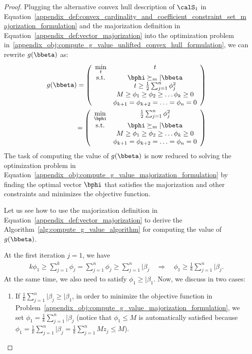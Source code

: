 \begin{proof}
Plugging the alternative convex hull description of $\calS_1$ in Equation~\eqref{appendix_def:convex_cardinality_and_coefficient_constraint_set_majorization_formulation} and the majorization definition in Equation~\eqref{appendix_def:vector_majorization} into the optimization problem in~\eqref{appendix_obj:compute_g_value_unlifted_convex_hull_formulation}, we can rewrite $g(\bbeta)$ as:
\begin{align}
    g(\bbeta) = \left(
    \begin{array}{cc}
        \min\limits_{t} & t \\
        \text{s.t.} & \bphi \succeq_m \vert{\bbeta} \\
        & t \geq \frac{1}{2} \sum_{j=1}^{n} \phi_j^2 \\
        & M \geq \phi_1 \geq \phi_2 \geq \ldots \phi_k \geq 0 \\
        & \phi_{k+1} = \phi_{k+2} = \ldots = \phi_n = 0
    \end{array}
    \right) \nonumber\\
    = \left(
    \begin{array}{cc}
        \min\limits_{\bphi} & \frac{1}{2} \sum_{j=1}^{n} \phi_j^2 \\
        \text{s.t.} &  \bphi \succeq_m \vert{\bbeta} \\
        & M \geq \phi_1 \geq \phi_2 \geq \ldots \phi_k \geq 0 \\
        & \phi_{k+1} = \phi_{k+2} = \ldots = \phi_n = 0
    \end{array}
    \right) \label{appendix_obj:compute_g_value_majorization_formulation}
\end{align}
The task of computing the value of $g(\bbeta)$ is now reduced to solving the optimization problem in Equation~\eqref{appendix_obj:compute_g_value_majorization_formulation} by finding the optimal vector $\bphi$ that satisfies the majorization and other constraints and minimizes the objective function.

Let us see how to use the majorization definition in Equation~\eqref{appendix_def:vector_majorization} to derive the Algorithm~\ref{alg:compute_g_value_algorithm} for computing the value of $g(\bbeta)$.

At the first iteration $j=1$, we have
\begin{align}
    k \phi_1 \geq \sum_{j=1}^k \phi_j = \sum_{j=1}^n \phi_j \geq \sum_{j=1}^n \vert{\beta_j} \quad \Rightarrow \quad \phi_1 \geq \frac{1}{k} \sum_{j=1}^n \vert{\beta_j}.
\end{align}
At the same time, we also need to satisfy $\phi_1 \geq \vert{\beta_1}$.
Now, we discuss in two cases:
\begin{enumerate}
    \item If $\frac{1}{k} \sum_{j=1}^n \vert{\beta_j} \geq \vert{\beta_1}$, in order to minimize the objective function in Problem~\eqref{appendix_obj:compute_g_value_majorization_formulation}, we set $\phi_1 = \frac{1}{k} \sum_{j=1}^n \vert{\beta_j}$ (notice that $\phi_1 \leq M$ is automatically satisfied because $\phi_1 = \frac{1}{k} \sum_{j=1}^n \vert{\beta_j} = \frac{1}{k} \sum_{j=1}^n M z_j \leq M$). 
    

\end{enumerate}
\end{proof}
